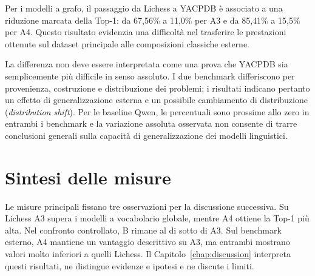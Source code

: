 Per i modelli a grafo, il passaggio da Lichess a YACPDB è associato a una riduzione marcata della Top-1: da 67,56\% a 11,0\% per A3 e da 85,41\% a 15,5\% per A4. Questo risultato evidenzia una difficoltà nel trasferire le prestazioni ottenute sul dataset principale alle composizioni classiche esterne.

La differenza non deve essere interpretata come una prova che YACPDB sia semplicemente più difficile in senso assoluto. I due benchmark differiscono per provenienza, costruzione e distribuzione dei problemi; i risultati indicano pertanto un effetto di generalizzazione esterna e un possibile cambiamento di distribuzione (\textit{distribution shift}). Per le baseline Qwen, le percentuali sono prossime allo zero in entrambi i benchmark e la variazione assoluta osservata non consente di trarre conclusioni generali sulla capacità di generalizzazione dei modelli linguistici.

\section{Sintesi delle misure}

Le misure principali fissano tre osservazioni per la discussione successiva. Su
Lichess A3 supera i modelli a vocabolario globale, mentre A4 ottiene la Top-1 più
alta. Nel confronto controllato, B rimane al di sotto di A3. Sul benchmark esterno,
A4 mantiene un vantaggio descrittivo su A3, ma entrambi mostrano valori molto
inferiori a quelli Lichess. Il Capitolo~\ref{chap:discussion} interpreta questi
risultati, ne distingue evidenze e ipotesi e ne discute i limiti.
